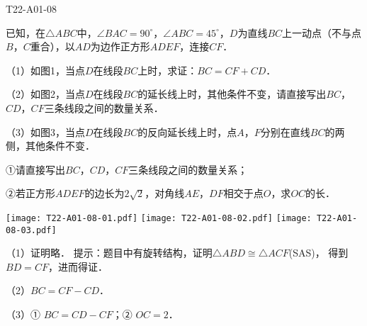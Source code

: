 \begin{defproblem}{T22-A01-08}%
\begin{onlyproblem}%
已知，在$\triangle ABC$中，$\angle BAC=90^{\circ }$，$\angle ABC=45^{\circ }$，$D$为直线$BC$上一动点（不与点$B$，$C$重合），以$AD$为边作正方形$ADEF$，连接$CF$．

（1）如图1，当点$D$在线段$BC$上时，求证：$BC=CF+CD$．

（2）如图2，当点$D$在线段$BC$的延长线上时，其他条件不变，请直接写出$BC$，$CD$，$CF$三条线段之间的数量关系．

（3）如图3，当点$D$在线段$BC$的反向延长线上时，点$A$，$F$分别在直线$BC$的两侧，其他条件不变．

①请直接写出$BC$，$CD$，$CF$三条线段之间的数量关系；

②若正方形$ADEF$的边长为$2\sqrt 2$，对角线$AE$，$DF$相交于点$O$，求$OC$的长．


\begin{center}
\texttt{[image: T22-A01-08-01.pdf]}\qquad
\texttt{[image: T22-A01-08-02.pdf]}\qquad
\texttt{[image: T22-A01-08-03.pdf]}
\end{center}



\end{onlyproblem}%
\begin{onlysolution}%
（1）证明略．
提示：题目中有旋转结构，证明$\triangle ABD\cong \triangle ACF$(SAS)，
得到$BD=CF$，进而得证．

（2）$BC=CF-CD$．

（3）① $BC=CD-CF$；② $OC=2$．
	

\begin{center}
\end{center}
\end{onlysolution}%
\end{defproblem}






